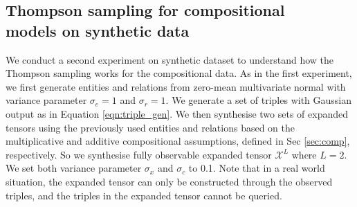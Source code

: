 \subsection{Thompson sampling for compositional\\ models on synthetic data}

We conduct a second experiment on synthetic dataset to understand how
the Thompson sampling works for the compositional data. 
As in the first experiment, we first generate entities and relations from 
zero-mean multivariate normal with variance parameter $\sigma_e = 1$ and 
$\sigma_r=1$. We generate a set of triples with Gaussian output as in 
Equation \ref{eqn:triple_gen}. We then synthesise two sets of expanded tensors 
using the previously used entities and relations based on the multiplicative 
and additive compositional assumptions, defined in Sec \ref{sec:comp}, 
respectively. So we synthesise fully observable expanded tensor $\mathcal{X}^L$ 
where $L=2$. We set both variance parameter $\sigma_x$ and $\sigma_c$ to 0.1. 
Note that in a real world situation, the expanded tensor can only be constructed 
through the observed triples, and the triples in the expanded tensor cannot be queried.

